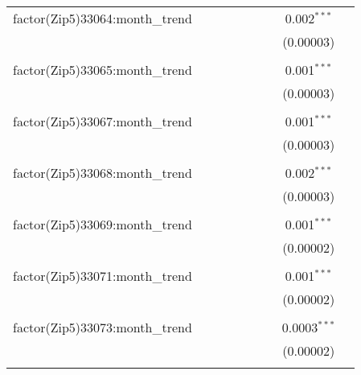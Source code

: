 \begin{table}[H]
{\begin{tabular}{@{\extracolsep{5pt}}lcccccccc}
  factor(Zip5)33064:month\_trend &  &  &  &  &  &  & 0.002$^{***}$ &  \\  

   &  &  &  &  &  &  & (0.00003) &  \\  

   & & & & & & & & \\  

  factor(Zip5)33065:month\_trend &  &  &  &  &  &  & 0.001$^{***}$ &  \\  

   &  &  &  &  &  &  & (0.00003) &  \\  

   & & & & & & & & \\  

  factor(Zip5)33067:month\_trend &  &  &  &  &  &  & 0.001$^{***}$ &  \\  

   &  &  &  &  &  &  & (0.00003) &  \\  

   & & & & & & & & \\  

  factor(Zip5)33068:month\_trend &  &  &  &  &  &  & 0.002$^{***}$ &  \\  

   &  &  &  &  &  &  & (0.00003) &  \\  

   & & & & & & & & \\  

  factor(Zip5)33069:month\_trend &  &  &  &  &  &  & 0.001$^{***}$ &  \\  

   &  &  &  &  &  &  & (0.00002) &  \\  

   & & & & & & & & \\  

  factor(Zip5)33071:month\_trend &  &  &  &  &  &  & 0.001$^{***}$ &  \\  

   &  &  &  &  &  &  & (0.00002) &  \\  

   & & & & & & & & \\  

  factor(Zip5)33073:month\_trend &  &  &  &  &  &  & 0.0003$^{***}$ &  \\  

   &  &  &  &  &  &  & (0.00002) &  \\  

   & & & & & & & & \\  


\end{tabular}}
\end{table}
